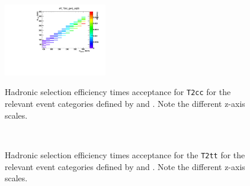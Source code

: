 \begin{figure}[h!]
\begin{center}
{      \includegraphics[width=0.4\textwidth,page=2]{figures/sms/t2cc/v1/T2cc_eff}
    } 
    \caption{Hadronic selection efficiency times acceptance for \texttt{T2cc}
      for the relevant event categories defined by \njet and \nb.
      Note the different z-axis scales.}
    \label{fig:sms-eff-t2cc}
  \end{center}
\end{figure}

\begin{figure}[!h]
  \begin{center}
     \\
    \caption{Hadronic selection efficiency times acceptance for the \texttt{T2tt}
      for the relevant event categories defined by \njet and \nb.
       Note the different z-axis scales.}
    \label{fig:sms-eff-t2tt}
  \end{center}
\end{figure}

